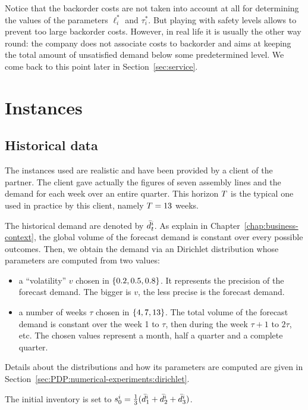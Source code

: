 Notice that the backorder costs are not taken into account at all for determining the values of the parameters $\ell_i^*$ and $\tau_i^*$.
But playing with safety levels allows to prevent too large backorder costs. However, in real life it is usually the other way round: the company does not associate costs to backorder and aims at keeping the total amount of unsatisfied demand below some predetermined level. We come back to this point later in Section~\ref{sec:service}.




\section{Instances}

\subsection{Historical data}

The instances used are realistic and have been provided by a client of the partner. The client gave actually the figures of seven assembly lines and the demand for each week over an entire quarter.
This horizon $T$ is the typical one used in practice by this client, namely $T=13$ weeks.

The historical demand are denoted by $\bar{d}_t^i$. As explain in Chapter~\ref{chap:business-context}, the global volume of the forecast demand is constant over every possible outcomes. Then, we obtain the demand via an Dirichlet distribution whose parameters are computed from two values:
\begin{itemize}
  \item a ``volatility'' $v$ chosen in $\crbracket{0.2,0.5, 0.8}$. It represents the precision of the forecast demand. The bigger is $v$, the less precise is the forecast demand.
  \item a number of weeks $\tau$ chosen in $\crbracket{4,7,13}$. The total volume of the forecast demand is constant over the week 1 to $\tau$, then during the week $\tau+1$ to $2\tau$, etc. The chosen values represent a month, half a quarter and a complete quarter.
\end{itemize}
Details about the distributions and how its parameters are computed are given in Section~\ref{sec:PDP:numerical-experiments:dirichlet}.

The initial inventory is set to $s_0^i=\frac{1}{3}(\bar{d}_1^i+\bar{d}_2^i+\bar{d}_3^i)$.

